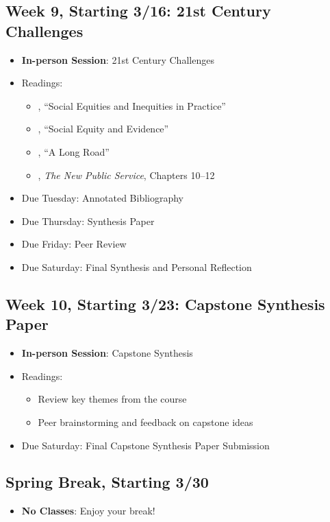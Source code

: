 \documentclass[12pt, letterpaper]{article}
\begin{document}
\subsection*{Week 9, Starting 3/16: 21st Century Challenges}
\begin{itemize}
    \item \textbf{In-person Session}: 21st Century Challenges
    \item Readings:
        \begin{itemize}
            \item \citet{maynard-moody2012}, ``Social Equities and Inequities in Practice'' 
            \item \citet{GOODEN2017}, ``Social Equity and Evidence'' 
            \item \citet{mccandless2022}, ``A Long Road''
            \item \citet{Denhardt2015}, \emph{The New Public Service}, Chapters 10--12 
        \end{itemize}
    \item Due Tuesday: Annotated Bibliography
    \item Due Thursday: Synthesis Paper
    \item Due Friday: Peer Review
    \item Due Saturday: Final Synthesis and Personal Reflection
\end{itemize}

\subsection*{Week 10, Starting 3/23: Capstone Synthesis Paper}
\begin{itemize}
    \item \textbf{In-person Session}: Capstone Synthesis
    \item Readings:
        \begin{itemize}
            \item Review key themes from the course
            \item Peer brainstorming and feedback on capstone ideas
        \end{itemize}
    \item Due Saturday: Final Capstone Synthesis Paper Submission
\end{itemize}

\subsection*{Spring Break, Starting 3/30}
\begin{itemize}
    \item \textbf{No Classes}: Enjoy your break!
\end{itemize}
\end{document}
